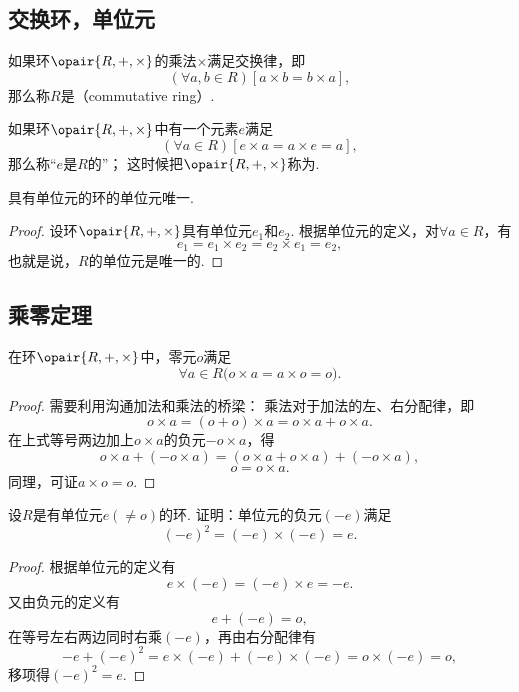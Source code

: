 \subsection{交换环，单位元}
\begin{definition}
如果环\(\opair{R,+,\times}\)的乘法\(\times\)满足交换律，即\[
	(\forall a,b \in R)[a \times b = b \times a],
\]
那么称\(R\)是（commutative ring）.
\end{definition}

\begin{definition}
如果环\(\opair{R,+,\times}\)中有一个元素\(e\)满足\[
	(\forall a \in R)[e \times a = a \times e = a],
\]
那么称“\(e\)是\(R\)的”；
这时候把\(\opair{R,+,\times}\)称为.
\end{definition}

\begin{property}
具有单位元的环的单位元唯一.
\begin{proof}
设环\(\opair{R,+,\times}\)具有单位元\(e_1\)和\(e_2\).
根据单位元的定义，对\(\forall a \in R\)，有\[
    e_1 = e_1 \times e_2 = e_2 \times e_1 = e_2,
\]
也就是说，\(R\)的单位元是唯一的.
\end{proof}
\end{property}

\subsection{乘零定理}
\begin{theorem}[乘零定理]
在环\(\opair{R,+,\times}\)中，零元\(o\)满足\[
    \forall a \in R \bigl( o \times a = a \times o = o \bigr).
\]
\begin{proof}
需要利用沟通加法和乘法的桥梁：
乘法对于加法的左、右分配律，即\[
    o \times a = (o + o) \times a = o \times a + o \times a.
\]在上式等号两边加上\(o \times a\)的负元\(-o \times a\)，得\[
    o \times a + (- o \times a) = (o \times a + o \times a) + (- o \times a),
\]\[
    o = o \times a.
\]
同理，可证\(a \times o = o\).
\end{proof}
\end{theorem}

\begin{example}
设\(R\)是有单位元\(e(\neq o)\)的环.
证明：单位元的负元\((-e)\)满足\[
    (-e)^2=(-e)\times(-e)=e.
\]
\begin{proof}
根据单位元的定义有\[
    e \times (-e) = (-e) \times e = -e.
\]
又由负元的定义有\[
    e + (-e) = o,
\]
在等号左右两边同时右乘\((-e)\)，再由右分配律有\[
    -e + (-e)^2 = e \times (-e) + (-e) \times (-e) = o \times (-e) = o,
\]
移项得\((-e)^2 = e\).
\end{proof}
\end{example}


